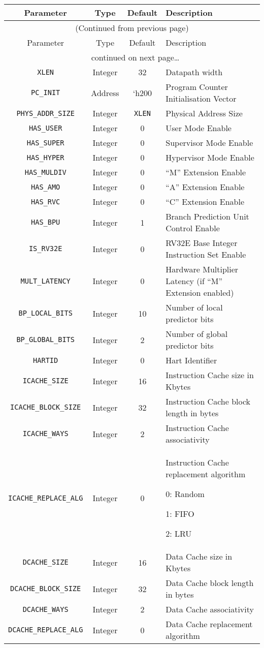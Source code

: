 \begin{longtable}[]{@{}cccp{7cm}@{}}
\toprule
Parameter & Type & Default & Description\tabularnewline
\midrule
\endfirsthead


\multicolumn{4}{c}{{(Continued from previous page)}} \\
\toprule
Parameter & Type & Default & Description\tabularnewline
\midrule
\endhead

\midrule \multicolumn{4}{c}{{\tablename\ \thetable{} continued on next page\ldots}} \\
\endfoot

\endlastfoot

\texttt{XLEN} & Integer & 32 & Datapath width\tabularnewline
\texttt{PC\_INIT} & Address & `h200 & Program Counter Initialisation
Vector\tabularnewline
\texttt{PHYS\_ADDR\_SIZE} & Integer & \texttt{XLEN} & Physical Address Size\tabularnewline
\texttt{HAS\_USER} & Integer & 0 & User Mode Enable\tabularnewline
\texttt{HAS\_SUPER} & Integer & 0 & Supervisor Mode Enable\tabularnewline
\texttt{HAS\_HYPER} & Integer & 0 & Hypervisor Mode Enable\tabularnewline
\texttt{HAS\_MULDIV} & Integer & 0 & ``M'' Extension Enable\tabularnewline
\texttt{HAS\_AMO} & Integer & 0 & ``A'' Extension Enable\tabularnewline
\texttt{HAS\_RVC} & Integer & 0 & ``C'' Extension Enable\tabularnewline
\texttt{HAS\_BPU} & Integer & 1 & Branch Prediction Unit Control Enable\tabularnewline
\texttt{IS\_RV32E} & Integer & 0 & RV32E Base Integer Instruction Set
Enable\tabularnewline
\texttt{MULT\_LATENCY} & Integer & 0 & Hardware Multiplier Latency (if ``M''
Extension enabled)\tabularnewline
\texttt{BP\_LOCAL\_BITS} & Integer & 10 & Number of local predictor
bits\tabularnewline
\texttt{BP\_GLOBAL\_BITS} & Integer & 2 & Number of global predictor
bits\tabularnewline
\texttt{HARTID} & Integer & 0 & Hart Identifier\tabularnewline
\texttt{ICACHE\_SIZE} & Integer & 16 & Instruction Cache size in
Kbytes\tabularnewline
\texttt{ICACHE\_BLOCK\_SIZE} & Integer & 32 & Instruction Cache block length in
bytes\tabularnewline
\texttt{ICACHE\_WAYS} & Integer & 2 & Instruction Cache
associativity\tabularnewline
\texttt{ICACHE\_REPLACE\_ALG} & Integer & 0 & Instruction Cache replacement algorithm

0: Random

1: FIFO

2: LRU\tabularnewline

\texttt{DCACHE\_SIZE} & Integer & 16 & Data Cache size in Kbytes\tabularnewline
\texttt{DCACHE\_BLOCK\_SIZE} & Integer & 32 & Data Cache block length in bytes\tabularnewline
\texttt{DCACHE\_WAYS} & Integer & 2 & Data Cache associativity\tabularnewline
\texttt{DCACHE\_REPLACE\_ALG} & Integer & 0 & Data Cache replacement algorithm


\end{longtable}
